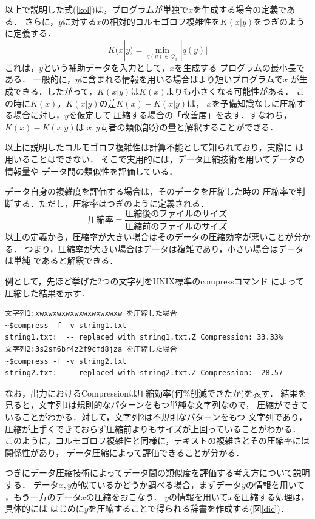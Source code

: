 以上で説明した式(\ref{kol})は，プログラムが単独で$x$を生成する場合の定義である．
さらに，$y$に対する$x$の相対的コルモゴロフ複雑性を$K(x|y)$をつぎのように定義する．
\begin{equation}
K(x|y) = \min_{q(y) \in Q_x} |q(y)| \label{kol2}
\end{equation}
これは，$y$という補助データを入力として，$x$を生成する
プログラムの最小長である．
一般的に，$y$に含まれる情報を用いる場合はより短いプログラムで$x$
が生成できる．したがって，$K(x|y)$は$K(x)$よりも小さくなる可能性がある．
この時に$K(x)$，$K(x|y)$の差$K(x)-K(x|y)$は，
$x$を予備知識なしに圧縮する場合に対し，$y$を仮定して
圧縮する場合の「改善度」を表す．すなわち，$K(x)-K(x|y)$は
$x,y$両者の類似部分の量と解釈することができる．

以上に説明したコルモゴロフ複雑性は計算不能として知られており，実際に
は用いることはできない．
そこで実用的には，データ圧縮技術を用いてデータの情報量や
データ間の類似性を評価している．

データ自身の複雑度を評価する場合は，そのデータを圧縮した時の
圧縮率で判断する．ただし，圧縮率はつぎのように定義される．
\begin{equation}
圧縮率 = \frac{圧縮後のファイルのサイズ}{圧縮前のファイルのサイズ}
\end{equation}
以上の定義から，圧縮率が大きい場合はそのデータの圧縮効率が悪いことが分かる．
つまり，圧縮率が大きい場合はデータは複雑であり，小さい場合はデータは単純
であると解釈できる．

例として，先ほど挙げた2つの文字列をUNIX標準のcompressコマンド
によって圧縮した結果を示す．

\begin{verbatim}
文字列1:xwxwxwxwxwxwxwxwxwxw を圧縮した場合
~$compress -f -v string1.txt
string1.txt:  -- replaced with string1.txt.Z Compression: 33.33%
文字列2:3s2sm6br4z2f9cfd8jza を圧縮した場合
~$compress -f -v string2.txt
string2.txt:  -- replaced with string2.txt.Z Compression: -28.57
\end{verbatim}
なお，出力におけるCompressionは圧縮効率(何\%削減できたか)を表す．
結果を見ると，文字列1は規則的なパターンをもつ単純な文字列なので，
圧縮ができていることがわかる．対して，文字列2は不規則なパターンをもつ
文字列であり，圧縮が上手くできておらず圧縮前よりもサイズが上回っていることがわかる．
このように，コルモゴロフ複雑性と同様に，テキストの複雑さとその圧縮率には関係性があり，
データ圧縮によって評価できることが分かる．

つぎにデータ圧縮技術によってデータ間の類似度を評価する考え方について説明する．
データ$x,y$が似ているかどうか調べる場合，まずデータ$y$の情報を用いて
，もう一方のデータ$x$の圧縮をおこなう．
$y$の情報を用いて$x$を圧縮する処理は，具体的には
はじめに$y$を圧縮することで得られる辞書を作成する(図\ref{dic})．

